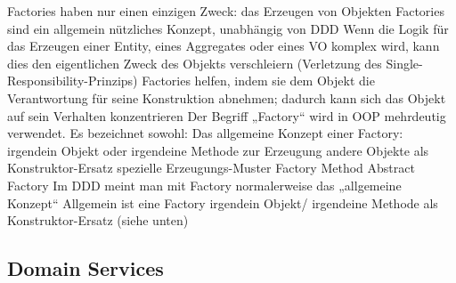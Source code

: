 Factories haben nur einen einzigen Zweck:
das Erzeugen von Objekten
Factories sind ein allgemein nützliches Konzept, unabhängig von DDD
Wenn die Logik für das Erzeugen einer Entity, eines Aggregates oder eines VO komplex wird, kann dies den eigentlichen Zweck des Objekts verschleiern (Verletzung des Single-Responsibility-Prinzips)
Factories helfen, indem sie dem Objekt die Verantwortung für seine Konstruktion abnehmen; dadurch kann sich das Objekt auf sein Verhalten konzentrieren
Der Begriff „Factory“ wird in OOP mehrdeutig verwendet. Es bezeichnet sowohl:
Das allgemeine Konzept einer Factory:
irgendein Objekt oder irgendeine Methode zur Erzeugung andere Objekte als Konstruktor-Ersatz
spezielle Erzeugungs-Muster
Factory Method
Abstract Factory
Im DDD meint man mit Factory normalerweise das „allgemeine Konzept“
Allgemein ist eine Factory irgendein Objekt/ irgendeine Methode als Konstruktor-Ersatz (siehe unten)




\subsection{Domain Services}

